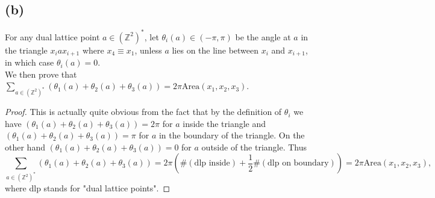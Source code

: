 \documentclass[a4paper,11pt]{article}
\newcommand{\Z}{\mathbb{Z}}
\newcommand{\Area}{\text{Area}}
\numberwithin{equation}{section}
\begin{document}
	\subsection*{(b)}
	For any dual lattice point $ a\in(\Z^2)^* $, let $ \theta_i(a)\in(-\pi,\pi) $ be the angle at $ a $ in the triangle $ x_iax_{i+1} $ where $ x_4\equiv x_1 $, unless $ a $ lies on the line between $ x_i $ and $ x_{i+1} $, in which case $ \theta_i(a)=0 $.\\
	We then prove that $ \sum_{a\in(\Z^2)^*}\left(\theta_1(a)+\theta_2(a)+\theta_3(a)\right)=2\pi\Area(x_1,x_2,x_3) $. \begin{proof}
		This is actually quite obvious from the fact that by the definition of $ \theta_i $ we have $ (\theta_1(a)+\theta_2(a)+\theta_3(a))=2\pi $ for $ a $ inside the triangle and $ (\theta_1(a)+\theta_2(a)+\theta_3(a))=\pi $ for $ a $ in the boundary of the triangle. On the other hand $ (\theta_1(a)+\theta_2(a)+\theta_3(a))=0 $ for $ a $ outside of the triangle. Thus \begin{equation}
		\sum_{a\in(\Z^2)^*}\left(\theta_1(a)+\theta_2(a)+\theta_3(a)\right)=2\pi\left(\#(\text{dlp inside})+\frac{1}{2}\#(\text{dlp on boundary})\right)=2\pi\Area(x_1,x_2,x_3),
		\end{equation}
		where dlp stands for "dual lattice points".
	\end{proof} 
\end{document}
